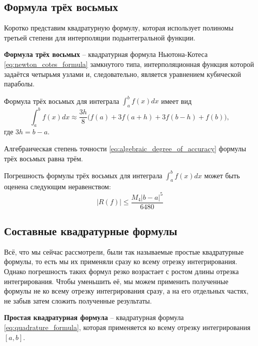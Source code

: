 \documentclass[../main.tex]{subfile}
\begin{document}
\subsection{Формула трёх восьмых}
Коротко представим квадратурную формулу, которая использует полиномы третьей
степени для интерполяции подынтегральной функции.

\begin{define}
	\textbf{Формула трёх восьмых} -- квадратурная формула Ньютона-Котеса
	\eqref{eq:newton_cotes_formula} замкнутого типа, интерполяционная
	функция которой задаётся четырьмя узлами и, следовательно, является
	уравнением кубической параболы.
\end{define}

\begin{theorem}\label{eq:simpsons_3_8_rule}
	Формула трёх восьмых для интеграла $\int_a^b f(x)dx$ имеет вид
	\[\boxed{\int_a^b f(x)dx\approx\frac{3h}{8}\big(f(a)+3f(a+h)+3f(b-h)+
	f(b)\big)},\]
	где $3h=b-a$.
\end{theorem}
\proofexercise



\begin{lemma}
	Алгебраическая степень точности \eqref{eq:algebraic_degree_of_accuracy}
	формулы трёх восьмых равна трём.
\end{lemma}
\proofexercise

\begin{theorem}
	Погрешность формулы трёх восьмых для интеграла $\int_a^b f(x)dx$ может
	быть оценена следующим неравенством:
	\[\boxed{|R(f)|\le\frac{M_4|b-a|^5}{6480}}\]
\end{theorem}
\proofexercise\newpage

\subsection{Составные квадратурные формулы}
Всё, что мы сейчас рассмотрели, были так называемые простые квадратурные
формулы, то есть мы их применяли сразу ко всему отрезку интегрирования. Однако
погрешность таких формул резко возрастает с ростом длины отрезка интегрирования.
Чтобы уменьшить её, мы можем применить полученные формулы не ко всему отрезку
интегрирования сразу, а на его отдельных частях, не забыв затем сложить
полученные результаты.

\begin{define}
	\textbf{Простая квадратурная формула} -- квадратурная формула
	\eqref{eq:quadrature_formula}, которая применяется ко всему отрезку
	интегрирования $[a,b]$.
\end{define}
\end{document}
